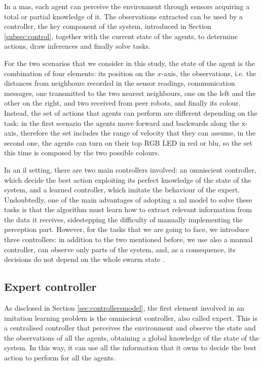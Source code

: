
In a \gls{mas}, each agent can perceive the environment through sensors 
acquiring a total or partial knowledge of it. The observations extracted can be 
used by a controller, the key component of the system, introduced in Section 
\ref{subsec:control}, together with the current state of the agents, to determine 
actions, draw inferences and finally solve tasks. 

For the two scenarios that we consider in this study, the state of the agent is the 
combination of four elements: its position on the $x$-axis, the observations, i.e. 
the distances from neighbours recorded in the sensor readings, communication 
messages, one transmitted to the two nearest neighbours, one on the left and the 
other on the right, and two received from peer robots, and finally its colour.
Instead, the set of actions that agents can perform are different depending on 
the task: in the first scenario the agents move forward and backwards along the 
x-axis, therefore the set includes the range of velocity that they can assume, in the 
second one, the agents  can turn on their top RGB LED in red or blu, so the set this 
time is composed by the two possible colours.

In an \gls{il} setting, there are two main controllers involved: an omniscient 
controller, which decide the best action exploiting its perfect knowledge of the 
state of the system, and a learned controller, which imitate the behaviour of the 
expert.
Undoubtedly, one of the main advantages of adopting a \gls{ml} model to solve 
these tasks is that the algorithm must learn how to extract relevant information 
from the data it receives, sidestepping the difficulty of manually implementing the 
perception part.
However, for the tasks that we are going to face, we introduce three controllers: in 
addition to the two mentioned before, we use also a manual controller, can 
observe only parts of the system, and, as a consequence, its decisions do not 
depend on the whole swarm state \cite[][]{vsovsic2016inverse}.

\subsection{Expert controller}
\label{subsec:expert}

As disclosed in Section \ref{sec:controllersmodel}, the first element involved in an 
imitation learning problem is the omniscient controller, also called expert. 
This is a centralised controller that perceives the environment and observe the 
state and the observations of all the agents, obtaining a global knowledge of the 
state of the system. In this way, it can use all the information that it owns to decide 
the best action to perform for all the agents. 

